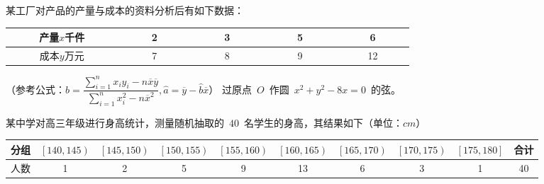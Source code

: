 \documentclass{BHCexam}
\begin{document}
\begin{questions}
\vspace{8cm}
\qs 某工厂对产品的产量与成本的资料分析后有如下数据：
\begin{center}
\begin{tabular}{|c|c|c|c|c|}
\hline
~~~~~产量$x$千件~~~~~&~~~~~2~~~~~&~~~~~3~~~~~&~~~~~5~~~~~&~~~~~6~~~~~  \\
\hline
成本$y$万元&7&8&9&12  \\
\hline
\end{tabular}
\end{center}
（{\kaishu 参考公式：}$\hat{b}=\dfrac{\sum\limits _{i=1}^{n} x_iy_i-n\overline{x}\overline{y}}{\sum\limits _{i=1}^{n} x_i ^2-n\overline{x}^2},\hat{a}=\overline{y}-\hat{b}\overline{x}$）
\vspace{8cm}
\qs 过原点~$O$~作圆~$x^2+y^2-8x=0$~的弦。
\vspace{8cm}
\qs 某中学对高三年级进行身高统计，测量随机抽取的~$40$~名学生的身高，其结果如下（单位：$cm$）\\
{%
\begin{tabular}{|c|c|c|c|c|c|c|c|c|c|}
\hline
分组&$\left[140,145\right)$&$\left[145,150\right)$&$\left[150,155\right)$&$\left[155,160\right)$&$\left[160,165\right)$&$\left[165,170\right)$%
&$\left[170,175\right)$&$\left[175,180\right]$&合计 \\
\hline
人数&1&2&5&9&13&6&3&1&40 \\
\hline
\end{tabular}
}
\begin{parts}

\end{parts}
\end{questions}
\end{document}
